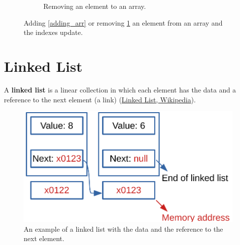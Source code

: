 \begin{figure}[H]
\begin{subfigure}[b]{\linewidth}
\caption{Removing an element to an array.}
\label{removing_arr}
\end{subfigure}
\caption[Adding \ref{adding_arr} or removing \ref{removing_arr} an element from an array and the indexes update.]{Adding \ref{adding_arr} or removing \ref{removing_arr} an element from an array and the indexes update.}
\label{array_2}
\end{figure}

\section{Linked List}
\label{linkedlist}
A \textbf{linked list} is a linear collection in which each element has the data and a reference to the next element (a link) \cite{wikilinkedlist} (\href{https://en.wikipedia.org/wiki/Linked_list}{Linked List, Wikipedia}). 
\begin{figure}[H]
	\begin{center}
		\includegraphics[scale=.6]{chapters/datastructures/images/linked_list_1.pdf}
		\caption[An example of a linked list with the data and the reference to the next element.]{An example of a linked list with the data and the reference to the next element.}
		\label{linked_list_1}
	\end{center}
\end{figure}

